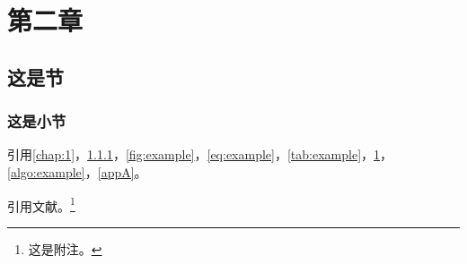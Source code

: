 \chapter{第二章}

\section{这是节}

\subsection{这是小节}\label{subsec:example}

引用\ref{chap:1}，\ref{subsec:example}，\ref{fig:example}，\ref{eq:example}，\ref{tab:example}，\ref{ft:example}，\ref{algo:example}，\ref{appA}。

引用文献\cite{trozzi2021umap}。\footnote{这是附注。\label{ft:example}}